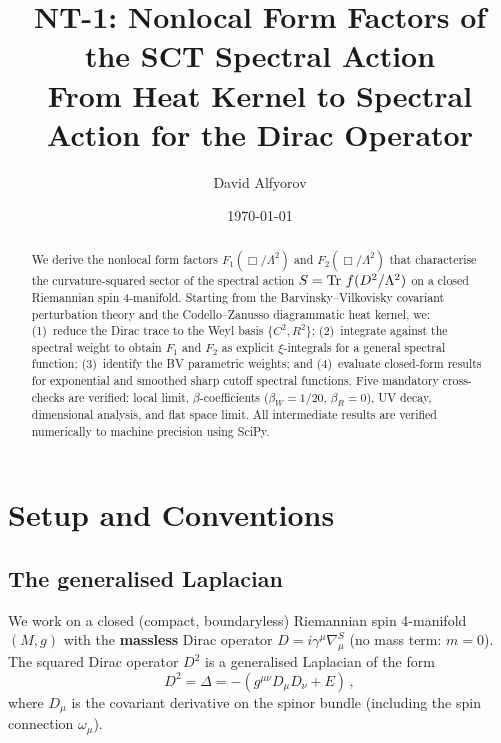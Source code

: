 \documentclass[11pt,a4paper]{article}
\title{%
  \textbf{NT-1: Nonlocal Form Factors of the SCT Spectral Action}\\[6pt]
  \large From Heat Kernel to Spectral Action for the Dirac Operator
}
\author{David Alfyorov}
\date{\today}
\theoremstyle{definition}
\theoremstyle{remark}
\begin{document}
\maketitle


\begin{center}
\end{center}

\begin{abstract}
We derive the nonlocal form factors $F_1(\Box/\Lambda^2)$ and
$F_2(\Box/\Lambda^2)$ that characterise the curvature-squared sector
of the spectral action $S = \Tr\,f(D^2/\Lambda^2)$ on a closed
Riemannian spin 4-manifold.  Starting from the Barvinsky--Vilkovisky
covariant perturbation theory and the Codello--Zanusso diagrammatic
heat kernel, we: (1)~reduce the Dirac trace to the Weyl basis
$\{C^2, R^2\}$; (2)~integrate against the spectral weight to obtain
$F_1$ and $F_2$ as explicit $\xi$-integrals for a general spectral
function; (3)~identify the BV parametric weights; and (4)~evaluate
closed-form results for exponential and smoothed sharp cutoff spectral
functions.  Five mandatory cross-checks are verified: local limit,
$\beta$-coefficients ($\beta_W = 1/20$, $\beta_R = 0$), UV decay,
dimensional analysis, and flat space limit.  All intermediate results
are verified numerically to machine precision using SciPy.
\end{abstract}

\tableofcontents
\newpage


\section{Setup and Conventions}
\label{sec:setup}

\subsection{The generalised Laplacian}

We work on a closed (compact, boundaryless) Riemannian spin 4-manifold
$(M,g)$ with the \textbf{massless} Dirac operator $D = i\gamma^\mu\nabla^S_\mu$
(no mass term: $m = 0$).  The squared Dirac operator $D^2$ is a generalised
Laplacian of the form
\begin{equation}
  D^2 = \Delta = -(g^{\mu\nu}D_\mu D_\nu + E)\,,
  \label{eq:gen-laplacian}
\end{equation}
where $D_\mu$ is the covariant derivative on the spinor bundle
(including the spin connection $\omega_\mu$).
\end{document}
